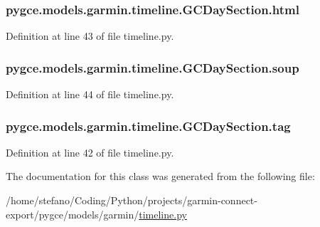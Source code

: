 \subsubsection[{\texorpdfstring{html}{html}}]{\setlength{\rightskip}{0pt plus 5cm}pygce.\+models.\+garmin.\+timeline.\+G\+C\+Day\+Section.\+html}\hypertarget{classpygce_1_1models_1_1garmin_1_1timeline_1_1_g_c_day_section_ac70b12b38ec07c1afbd3198a2620fe86}{}\label{classpygce_1_1models_1_1garmin_1_1timeline_1_1_g_c_day_section_ac70b12b38ec07c1afbd3198a2620fe86}


Definition at line 43 of file timeline.\+py.

\subsubsection[{\texorpdfstring{soup}{soup}}]{\setlength{\rightskip}{0pt plus 5cm}pygce.\+models.\+garmin.\+timeline.\+G\+C\+Day\+Section.\+soup}\hypertarget{classpygce_1_1models_1_1garmin_1_1timeline_1_1_g_c_day_section_ae04dcff466d78ae686dce462057260a9}{}\label{classpygce_1_1models_1_1garmin_1_1timeline_1_1_g_c_day_section_ae04dcff466d78ae686dce462057260a9}


Definition at line 44 of file timeline.\+py.

\subsubsection[{\texorpdfstring{tag}{tag}}]{\setlength{\rightskip}{0pt plus 5cm}pygce.\+models.\+garmin.\+timeline.\+G\+C\+Day\+Section.\+tag}\hypertarget{classpygce_1_1models_1_1garmin_1_1timeline_1_1_g_c_day_section_a3dacbeacfedec2f69dcbb9fe6870f8a3}{}\label{classpygce_1_1models_1_1garmin_1_1timeline_1_1_g_c_day_section_a3dacbeacfedec2f69dcbb9fe6870f8a3}


Definition at line 42 of file timeline.\+py.



The documentation for this class was generated from the following file\+:\begin{DoxyCompactItemize}
\item 
/home/stefano/\+Coding/\+Python/projects/garmin-\/connect-\/export/pygce/models/garmin/\hyperlink{timeline_8py}{timeline.\+py}\end{DoxyCompactItemize}
